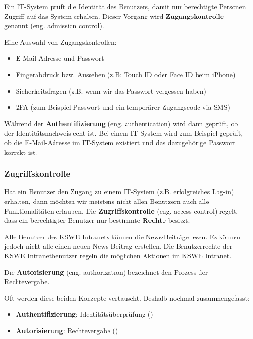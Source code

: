 Ein \ac{IT}-System prüft die Identität des Benutzers, damit nur berechtigte Personen Zugriff auf das System erhalten. Dieser Vorgang wird \textbf{Zugangskontrolle} genannt (eng. admission control).

\begin{example}
Eine Auswahl von Zugangskontrollen:
\begin{itemize}
\item E-Mail-Adresse und Passwort
\item Fingerabdruck bzw. Aussehen (z.B: Touch ID oder Face ID beim iPhone)
\item Sicherheitsfragen (z.B. wenn wir das Passwort vergessen haben)
\item \ac{2FA} (zum Beispiel Passwort und ein temporärer Zugangscode via \ac{SMS})
\end{itemize}
\end{example}

Während der \textbf{Authentifizierung} (eng. authentication) wird dann geprüft, ob der Identitätsnachweis echt ist. Bei einem \ac{IT}-System wird zum Beispiel geprüft, ob die E-Mail-Adresse im \ac{IT}-System existiert und das dazugehörige Passwort korrekt ist.

\subsubsection{Zugriffskontrolle}

Hat ein Benutzer den Zugang zu einem \ac{IT}-System (z.B. erfolgreiches Log-in) erhalten, dann möchten wir meistens nicht allen Benutzern auch alle Funktionalitäten erlauben. Die \textbf{Zugriffskontrolle} (eng. access control) regelt, dass ein berechtigter Benutzer nur bestimmte \textbf{Rechte} besitzt.

\begin{example}
Alle Benutzer des \ac{KSWE} Intranets können die News-Beiträge lesen. Es können jedoch nicht alle einen neuen News-Beitrag erstellen. Die Benutzerrechte der KSWE Intranetbenutzer regeln die möglichen Aktionen im \ac{KSWE} Intranet.
\end{example}
	
Die \textbf{Autorisierung} (eng. authorization) bezeichnet den Prozess der Rechtevergabe.

\begin{important}
Oft werden diese beiden Konzepte vertauscht. Deshalb nochmal zusammengefasst:
\begin{itemize}
\item \textbf{Authentifizierung}: Identitätsüberprüfung ()
\item \textbf{Autorisierung}: Rechtevergabe ()
\end{itemize}
\end{important}

